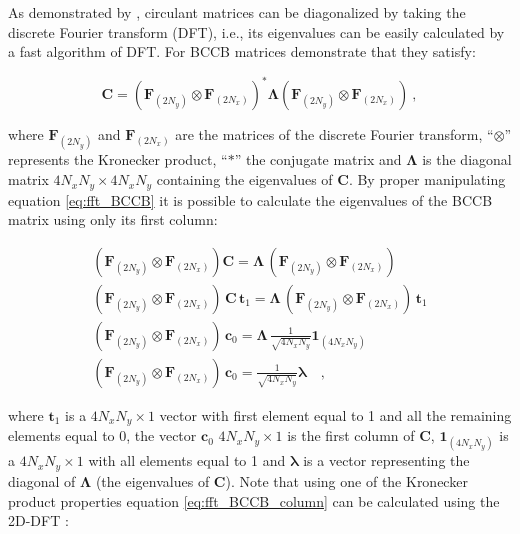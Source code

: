 \documentclass[manuscript,revised]{geophysics}
\begin{document}


As demonstrated by \cite{grenander-szego1984}, circulant matrices can be diagonalized by taking the discrete Fourier transform (DFT), i.e., its eigenvalues can be easily calculated by a fast algorithm of DFT. For BCCB matrices \cite{chan-jin2007} demonstrate that they satisfy:

\begin{equation}
\mathbf{C} = \left(\mathbf{F}_{(2N_y)} \otimes \mathbf{F}_{(2N_x)} \right)^{\ast} \mathbf{\Lambda}\left( \mathbf{F}_{(2N_y)} \otimes \mathbf{F}_{(2N_x)} \right) \: ,
\label{eq:fft_BCCB}
\end{equation}

\noindent where $\mathbf{F}_{(2N_y)}$ and $\mathbf{F}_{(2N_x)}$ are the matrices of the discrete Fourier transform, ``$\otimes$'' represents the Kronecker product, ``$\ast$'' the conjugate matrix and $\mathbf{\Lambda}$ is the diagonal matrix $4N_xN_y \times 4N_xN_y$ containing the eigenvalues of $\mathbf{C}$. By proper manipulating equation \ref{eq:fft_BCCB} it is possible to calculate the eigenvalues of the BCCB matrix using only its first column:

\begin{eqnarray}
\left( \mathbf{F}_{(2N_y)} \otimes \mathbf{F}_{(2N_x)} \right) \mathbf{C} = \mathbf{\Lambda} \, \left( \mathbf{F}_{(2N_y)} \otimes \mathbf{F}_{(2N_x)} \right) \\
\left( \mathbf{F}_{(2N_y)} \otimes \mathbf{F}_{(2N_x)} \right) \, \mathbf{C} \, \mathbf{t}_{1} = \mathbf{\Lambda} \, \left( \mathbf{F}_{(2N_y)} \otimes \mathbf{F}_{(2N_x)} \right) \, \mathbf{t}_{1} \\
\left( \mathbf{F}_{(2N_y)} \otimes \mathbf{F}_{(2N_x)} \right) \, \mathbf{c}_{0} = \mathbf{\Lambda} \, \frac{1}{\sqrt{4N_xN_y}}\mathbf{1}_{(4N_xN_y)} \\
\left( \mathbf{F}_{(2N_y)} \otimes \mathbf{F}_{(2N_x)} \right) \, \mathbf{c}_{0} = \frac{1}{\sqrt{4N_xN_y}} \mathbf{\lambda} \quad ,
\label{eq:fft_BCCB_column}
\end{eqnarray}

\noindent where $\mathbf{t}_{1}$ is a $4N_xN_y \times 1$ vector with first element equal to 1 and all the remaining elements equal to 0, the vector $\mathbf{c}_{0}$ $4N_xN_y \times 1$ is the first column of $\mathbf{C}$, $\mathbf{1}_{(4N_xN_y)}$ is a $4N_xN_y \times 1$ with all elements equal to 1 and $\mathbf{\lambda}$ is a vector representing the diagonal of $\mathbf{\Lambda}$ (the eigenvalues of $\mathbf{C}$). Note that using one of the Kronecker product properties equation \ref{eq:fft_BCCB_column} can be calculated using the 2D-DFT \citep{jain1989}:
\end{document}
